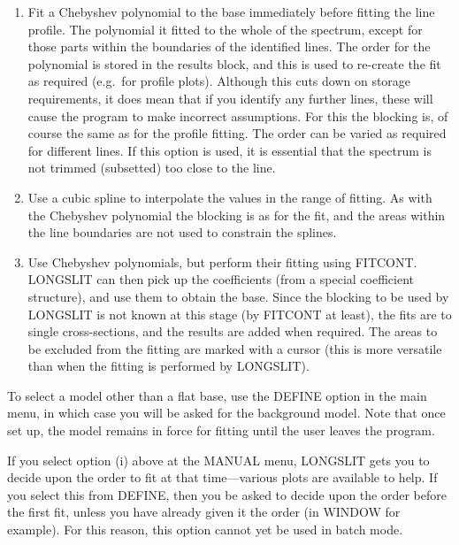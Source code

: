 \begin{enumerate}

\item Fit a Chebyshev polynomial to the base immediately before fitting
the line profile.  The polynomial it fitted to the whole of the
spectrum, except for those parts within the boundaries of the
identified lines.  The order for the polynomial is stored in the
results block, and this is used to re-create the fit as required
(e.g.\ for profile plots).  Although this cuts down on storage
requirements, it does mean that if you identify any further lines,
these will cause the program to make incorrect assumptions.  For this
the blocking is, of course the same as for the profile fitting.  The
order can be varied as required for different lines.  If this option is
used, it is essential that the spectrum is not trimmed (subsetted) too
close to the line.

\item Use a cubic spline to interpolate the values in the range of
fitting.  As with the Chebyshev polynomial the blocking is as for the
fit, and the areas within the line boundaries are not used to constrain
the splines.

\item Use Chebyshev polynomials, but perform their fitting using
FITCONT.  LONGSLIT can then pick up the coefficients (from a special
coefficient structure), and use them to obtain the base.  Since the
blocking to be used by LONGSLIT is not known at this stage (by FITCONT
at least), the fits are to single cross-sections, and the results are
added when required.  The areas to be excluded from the fitting are
marked with a cursor (this is more versatile than when the fitting is
performed by LONGSLIT).

\end{enumerate}

To select a model other than a flat base, use the DEFINE option in the
main menu, in which case you will be asked for the background model.
Note that once set up, the model remains in force for fitting until the
user leaves the program.

If you select option (i) above at the MANUAL menu, LONGSLIT gets you to
decide upon the order to fit at that time---various plots are available
to help.
If you select this from DEFINE, then you be asked to decide upon the
order before the first fit, unless you have already given it the order
(in WINDOW for example).
For this reason, this option cannot yet be used in batch mode.

